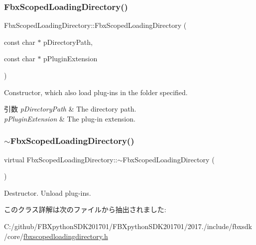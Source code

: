 \subsubsection{\texorpdfstring{Fbx\+Scoped\+Loading\+Directory()}{FbxScopedLoadingDirectory()}}
{\footnotesize\ttfamily Fbx\+Scoped\+Loading\+Directory\+::\+Fbx\+Scoped\+Loading\+Directory (\begin{DoxyParamCaption}\item[{const char $\ast$}]{p\+Directory\+Path,  }\item[{const char $\ast$}]{p\+Plugin\+Extension }\end{DoxyParamCaption})}

Constructor, which also load plug-\/ins in the folder specified. 
\begin{DoxyParams}{引数}
{\em p\+Directory\+Path} & The directory path. \\
\hline
{\em p\+Plugin\+Extension} & The plug-\/in extension. \\
\hline
\end{DoxyParams}
\mbox{\label{class_fbx_scoped_loading_directory_ae8a3e3331bf58edef910021442af358b}} 
\subsubsection{\texorpdfstring{$\sim$\+Fbx\+Scoped\+Loading\+Directory()}{~FbxScopedLoadingDirectory()}}
{\footnotesize\ttfamily virtual Fbx\+Scoped\+Loading\+Directory\+::$\sim$\+Fbx\+Scoped\+Loading\+Directory (\begin{DoxyParamCaption}{ }\end{DoxyParamCaption})\hspace{0.3cm}{\ttfamily [virtual]}}

Destructor. Unload plug-\/ins. 

このクラス詳解は次のファイルから抽出されました\+:\begin{DoxyCompactItemize}
\item 
C\+:/github/\+F\+B\+Xpython\+S\+D\+K201701/\+F\+B\+Xpython\+S\+D\+K201701/2017./include/fbxsdk/core/\hyperlink{fbxscopedloadingdirectory_8h}{fbxscopedloadingdirectory.\+h}\end{DoxyCompactItemize}
